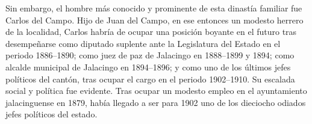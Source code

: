 \documentclass[14pt,twoside,final]{extbook} %
\begin{document}
Sin embargo, el hombre más conocido y prominente de esta dinastía familiar fue Carlos del Campo. Hijo de Juan del Campo, en ese entonces un modesto herrero de la localidad, Carlos habría de ocupar una posición boyante en el futuro tras desempeñarse como diputado suplente ante la Legislatura del Estado en el periodo 1886--1890; como juez de paz de Jalacingo en 1888--1899 y 1894; como alcalde municipal de Jalacingo en 1894--1896; y como uno de los últimos jefes políticos del cantón, tras ocupar el cargo en el periodo 1902--1910. Su escalada social y política fue evidente. Tras ocupar un modesto empleo en el ayuntamiento jalacinguense en 1879, había llegado a ser para 1902 uno de los dieciocho odiados jefes políticos del estado.
\end{document}
